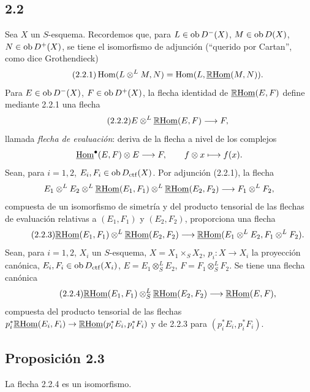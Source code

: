 \subsection*{2.2}
Sea $X$ un $S$-esquema. Recordemos que, para $L\in\operatorname{ob} D^{-}(X)$, $M\in\operatorname{ob} D(X)$, $N\in\operatorname{ob} D^{+}(X)$, se tiene el isomorfismo de adjunción (``querido por Cartan'', como dice Grothendieck)
\begin{equation}\tag{2.2.1}
\operatorname{Hom}(L\otimes^{L}M,N)=\operatorname{Hom}(L,\underline{\mathbb{R}\mathrm{Hom}}(M,N)).
\end{equation}
Para $E\in\operatorname{ob} D^{-}(X)$, $F\in\operatorname{ob} D^{+}(X)$, la flecha identidad de $\underline{\mathbb{R}\mathrm{Hom}}(E,F)$ define mediante 2.2.1 una flecha
\begin{equation}\tag{2.2.2}
E\otimes^{L}\underline{\mathbb{R}\mathrm{Hom}}(E,F)\longrightarrow F,
\end{equation}
llamada \emph{flecha de evaluación}: deriva de la flecha a nivel de los complejos
\[
\underline{\operatorname{Hom}}^{\bullet}(E,F)\otimes E\longrightarrow F,
\qquad f\otimes x\longmapsto f(x).
\]
Sean, para $i=1,2$, $E_i,F_i\in\operatorname{ob} D_{\mathrm{ctf}}(X)$. Por adjunción (2.2.1), la flecha
\[
E_1\otimes^{L}E_2\otimes^{L}\underline{\mathbb{R}\mathrm{Hom}}(E_1,F_1)\otimes^{L}\underline{\mathbb{R}\mathrm{Hom}}(E_2,F_2)\longrightarrow F_1\otimes^{L}F_2,
\]
compuesta de un isomorfismo de simetría y del producto tensorial de las flechas de evaluación relativas a $(E_1,F_1)$ y $(E_2,F_2)$, proporciona una flecha
\begin{equation}\tag{2.2.3}
\underline{\mathbb{R}\mathrm{Hom}}(E_1,F_1)\otimes^{L}\underline{\mathbb{R}\mathrm{Hom}}(E_2,F_2)\longrightarrow\underline{\mathbb{R}\mathrm{Hom}}(E_1\otimes^{L}E_2,F_1\otimes^{L}F_2).
\end{equation}
Sean, para $i=1,2$, $X_i$ un $S$-esquema, $X=X_1\times_SX_2$, $p_i:X\to X_i$ la proyección canónica, $E_i,F_i\in\operatorname{ob} D_{\mathrm{ctf}}(X_i)$, $E=E_1\otimes^{L}_{S}E_2$, $F=F_1\otimes^{L}_{S}F_2$. Se tiene una flecha canónica
\begin{equation}\tag{2.2.4}
\underline{\mathbb{R}\mathrm{Hom}}(E_1,F_1)\otimes^{L}_{S}\underline{\mathbb{R}\mathrm{Hom}}(E_2,F_2)\longrightarrow\underline{\mathbb{R}\mathrm{Hom}}(E,F),
\end{equation}
compuesta del producto tensorial de las flechas $p_i^{*}\underline{\mathbb{R}\mathrm{Hom}}(E_i,F_i)\to\underline{\mathbb{R}\mathrm{Hom}}(p_i^{*}E_i,p_i^{*}F_i)$ y de 2.2.3 para $(p_i^{*}E_i,p_i^{*}F_i)$.

\subsection*{Proposición 2.3}
La flecha 2.2.4 es un isomorfismo.

